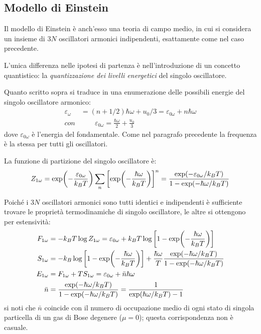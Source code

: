 \subsection{Modello di Einstein}
\label{sec:einheatcap}

Il modello di Einstein è anch'esso una teoria di campo medio, in cui si considera un insieme di $ 3N $ oscillatori armonici indipendenti, esattamente come nel caso precedente.

L'unica differenza nelle ipotesi di partenza è nell'introduzione di un concetto quantistico: la \textit{quantizzazione dei livelli energetici} del singolo oscillatore.
\newline

Quanto scritto sopra si traduce in una enumerazione delle possibili energie del singolo oscillatore armonico:
\begin{align*}
	\varepsilon_\omega &= (n + 1/2) \hbar \omega + u_0/3 = \varepsilon_{0 \omega} + n \hbar \omega\\
	con &\qquad \varepsilon_{0 \omega} =  \frac{\hbar \omega}{2}  + \frac{u_0}{3}
\end{align*}
dove $  \varepsilon_{0 \omega} $ è l'energia del fondamentale. Come nel paragrafo precedente la frequenza è la stessa per tutti gli oscillatori.

La funzione di partizione del singolo oscillatore è:
\begin{equation*}
	Z_{1\omega} = \exp(-\frac{ \varepsilon_{0 \omega}}{k_B T}) \sum_n \left[\exp(-\frac{ \hbar \omega}{k_B T})\right]^n = \frac{\exp(- \varepsilon_{0 \omega}/k_B T)}{1 - \exp(- \hbar \omega/k_B T)}
\end{equation*}

Poiché i $ 3N $ oscillatori armonici sono tutti identici e indipendenti è sufficiente trovare le proprietà termodinamiche di singolo oscillatore, le altre si ottengono per estensività:
\begin{align*}
	F_{1\omega} &= - k_B T \log Z_{1\omega}  = \varepsilon_{0 \omega} + k_B T \log \left[1 - \exp(-\frac{ \hbar \omega}{k_B T})\right]\\
	S_{1\omega} &= - k_B \log \left[1 - \exp(-\frac{ \hbar \omega}{k_B T})\right]  + \frac{\hbar \omega}{T} \frac{\exp(- \hbar \omega/k_B T)}{1 - \exp(- \hbar \omega/k_B T)}\\
	E_{1\omega} &= 	F_{1\omega} + T S_{1\omega} = \varepsilon_{0 \omega} + \bar{n} \hbar \omega\\
	\bar{n} &= \frac{\exp(- \hbar \omega/k_B T)}{1 - \exp(- \hbar \omega/k_B T)} = \frac{1}{\exp(\hbar \omega/k_B T) - 1}
\end{align*}
si noti che $ \bar{n} $ coincide con il numero di occupazione medio di ogni stato di singola particella di un gas di Bose degenere ($ \mu = 0 $); questa corrispondenza non è casuale.

